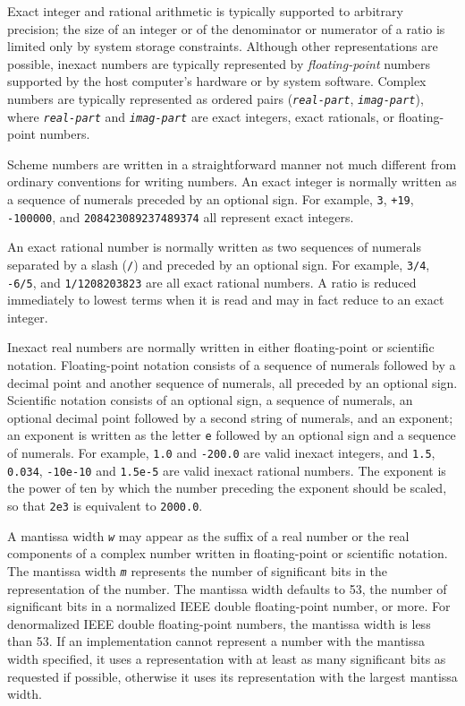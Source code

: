 Exact integer and rational arithmetic is typically supported to
\label{objects_s76}arbitrary precision; the size of an integer or of the denominator
or numerator of a ratio is limited only by system storage constraints.
Although other representations are possible,
inexact numbers are typically represented by \label{objects_s77}\textit{floating-point} numbers supported by the host computer's
hardware or by system software.
Complex numbers are typically represented as ordered pairs
(\texttt{\textit{real-part}}, \texttt{\textit{imag-part}}), where \texttt{\textit{real-part}} and \texttt{\textit{imag-part}}
are exact integers, exact rationals, or floating-point numbers.


Scheme numbers are written in a straightforward manner not much different from
ordinary conventions for writing numbers.
An exact integer is normally written as a sequence of numerals
preceded by an optional sign.
For example, \texttt{3}, \texttt{+19}, \texttt{-100000}, and
\texttt{208423089237489374} all represent exact integers.


An exact rational number is normally written as two sequences of numerals
separated by a slash (\texttt{/}) and preceded by an optional sign.
For example, \texttt{3/4}, \texttt{-6/5}, and \texttt{1/1208203823} are all exact
rational numbers.
A ratio is reduced immediately to lowest terms when it is read and may in fact
reduce to an exact integer.


Inexact real numbers are normally written in either
floating-point or scientific notation.
Floating-point notation consists of a sequence of
numerals followed by a decimal point and another sequence of
numerals, all preceded by an optional sign.
Scientific notation consists of an optional sign, a sequence of numerals,
an optional decimal point followed by a second string of numerals,
and an exponent; an exponent is written as the letter \texttt{e}
followed by an optional sign and a sequence of numerals.
For example, \texttt{1.0} and \texttt{-200.0} are valid inexact integers, and
\texttt{1.5}, \texttt{0.034}, \texttt{-10e-10} and \texttt{1.5e-5} are valid inexact rational
numbers.
The exponent is the power of ten by which the number preceding the
exponent should be scaled, so that \texttt{2e3} is equivalent to \texttt{2000.0}.


A mantissa width \texttt{\textbar{}\textit{w}} may appear as the suffix of a real
number or the real components of a complex number written in floating-point
or scientific notation.
The mantissa width \texttt{\textit{m}} represents the number of significant bits
in the representation of the number.
The mantissa width defaults to 53, the number of significant bits in
a normalized IEEE double floating-point number, or more.
For denormalized IEEE double floating-point numbers, the mantissa width is
less than 53.
If an implementation cannot represent a number with the mantissa width
specified, it uses a representation with at least as many significant
bits as requested if possible, otherwise it uses its representation with
the largest mantissa width.


